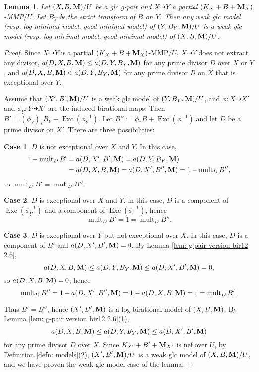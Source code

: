 \documentclass[11pt]{amsart}
\numberwithin{equation}{section}
\newcommand{\Mm}{{\bf{M}}}
\newcommand{\Exc}{\operatorname{Exc}}
\newcommand{\mult}{\operatorname{mult}}
\newtheorem{lem}[thm]{Lemma}
\theoremstyle{definition}
\theoremstyle{definition}
\theoremstyle{definition}
\begin{document}
\begin{lem}\label{lem: run mmp keep minimal model}
Let $(X,B,\Mm)/U$ be a glc g-pair and $X\dashrightarrow Y$ a partial $(K_X+B+\Mm_X)$-MMP$/U$. Let $B_Y$ be the strict transform of $B$ on $Y$. Then any weak glc model (resp. log minimal model, good minimal model) of $(Y,B_Y,\Mm)/U$ is a weak glc model (resp. log minimal model, good minimal model) of $(X,B,\Mm)/U$.
\end{lem}
\begin{proof}
Since $X\dashrightarrow Y$ is a partial $(K_X+B+\Mm_X)$-MMP$/U$, $X\dashrightarrow Y$ does not extract any divisor, $a(D,X,B,\Mm)\leq a(D,Y,B_Y,\Mm)$ for any prime divisor $D$ over $X$ or $Y$, and $a(D,X,B,\Mm)<a(D,Y,B_Y,\Mm)$ for any prime divisor $D$ on $X$ that is exceptional over $Y$.

Assume that $(X',B',\Mm)/U$ is a weak glc model of $(Y,B_Y,\Mm)/U$, and $\phi: X\dashrightarrow X'$ and $\phi_Y: Y\dashrightarrow X'$ are the induced birational maps. Then $B'=(\phi_Y)_*B_Y+\Exc(\phi_Y^{-1})$. Let $B'':=\phi_*B+\Exc(\phi^{-1})$ and let $D$ be a prime divisor on $X'$. There are three possibilities:

\medskip

\noindent\textbf{Case 1}. $D$ is not exceptional over $X$ and $Y$. In this case,
\begin{align*}
    1-\mult_DB'&=a(D,X',B',\Mm)=a(D,Y,B_Y,\Mm)\\
    &=a(D,X,B,\Mm)=a(D,X',B'',\Mm)=1-\mult_DB'',
\end{align*}
so $\mult_DB'=\mult_DB''$.

\medskip

\noindent\textbf{Case 2}. $D$ is exceptional over $X$ and $Y$. In this case, $D$ is a component of $\Exc(\phi_Y^{-1})$ and a component of $\Exc(\phi^{-1})$, hence
$$\mult_DB'=1=\mult_DB''.$$

\medskip

\noindent\textbf{Case 3}. $D$ is exceptional over $Y$ but not exceptional over $X$. In this case, $D$ is a component of $B'$ and $a(D,X',B',\Mm)=0$. By Lemma \ref{lem: g-pair version bir12 2.6},
$$a(D,X,B,\Mm)\leq a(D,Y,B_Y,\Mm)\leq a(D,X',B',\Mm)=0,$$
so $a(D,X,B,\Mm)=0$, hence $$\mult_DB''=1-a(D,X',B'',\Mm)=1-a(D,X,B,\Mm)=1=\mult_DB'.$$

Thus $B'=B''$, hence $(X',B',\Mm)$ is a log birational model of $(X,B,\Mm)$. By Lemma \ref{lem: g-pair version bir12 2.6}(1), 
$$a(D,X,B,\Mm)\leq a(D,Y,B_Y,\Mm)\leq a(D,X',B',\Mm)$$
for any prime divisor $D$ over $X$. Since $K_{X'}+B'+\Mm_{X'}$ is nef over $U$, by Definition \ref{defn: models}(2), $(X',B',\Mm)/U$ is a weak glc model of $(X,B,\Mm)/U$, and we have proven the weak glc model case of the lemma. 


\end{proof}
\end{document}
